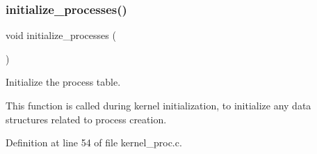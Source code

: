 \subsubsection{\texorpdfstring{initialize\+\_\+processes()}{initialize\_processes()}}
{\footnotesize\ttfamily void initialize\+\_\+processes (\begin{DoxyParamCaption}{ }\end{DoxyParamCaption})}



Initialize the process table. 

This function is called during kernel initialization, to initialize any data structures related to process creation. 

Definition at line 54 of file kernel\+\_\+proc.\+c.

